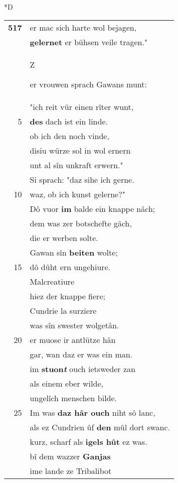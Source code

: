 \documentclass[8pt,a4paper,notitlepage]{article}
\begin{document}
\begin{table}[ht]
\begin{minipage}[t]{0.5\linewidth}
\small
\begin{center}*D
\end{center}
\begin{tabular}{rl}
\textbf{517} & er mac sich harte wol bejagen,\\ 
 & \textbf{gelernet} er bühsen veile tragen."\\ 
 & \begin{large}Z\end{large}er vrouwen sprach Gawans munt:\\ 
 & "ich reit vür einen rîter wunt,\\ 
5 & \textbf{des} dach ist ein linde.\\ 
 & ob ich den noch vinde,\\ 
 & disiu würze sol in wol ernern\\ 
 & unt al sîn unkraft erwern."\\ 
 & Si sprach: "daz sihe ich gerne.\\ 
10 & waz, ob ich kunst gelerne?"\\ 
 & Dô vuor \textbf{im} balde ein knappe nâch;\\ 
 & dem was zer botschefte gâch,\\ 
 & die er werben solte.\\ 
 & Gawan sîn \textbf{beiten} wolte;\\ 
15 & dô dûht ern ungehiure.\\ 
 & Malcreatiure\\ 
 & hiez der knappe fiere;\\ 
 & Cundrie la surziere\\ 
 & was sîn swester wolgetân.\\ 
20 & er muose ir antlütze hân\\ 
 & gar, wan daz er was ein man.\\ 
 & im \textbf{stuon\textit{t}} ouch ietsweder zan\\ 
 & als einem eber wilde,\\ 
 & ungelîch menschen bilde.\\ 
25 & Im was \textbf{daz hâr ouch} niht sô lanc,\\ 
 & als ez Cundrien ûf \textbf{den} mûl dort swanc.\\ 
 & kurz, scharf als \textbf{igels hût} ez was.\\ 
 & bî dem wazzer \textbf{Ganjas}\\ 
 & ime lande ze Tribalibot\\ 

\end{tabular}
\end{minipage}
\end{table}
\end{document}
